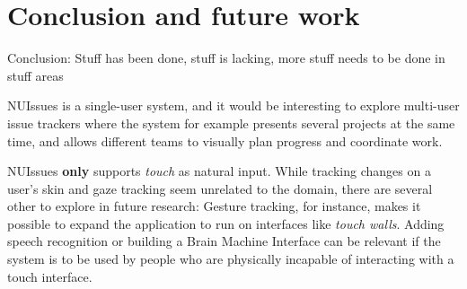 \section{Conclusion and future work}

Conclusion: Stuff has been done, stuff is lacking, more stuff needs to be done in stuff areas

NUIssues is a single-user system, and it would be interesting to explore multi-user issue trackers where the system for example presents several projects at the same time, and allows different teams to visually plan progress and coordinate work.

NUIssues \textbf{only} supports \textit{touch} as natural input. While tracking changes on a user's skin and gaze tracking seem unrelated to the domain, there are several other to explore in future research: Gesture tracking, for instance, makes it possible to expand the application to run on interfaces like \textit{touch walls}. Adding speech recognition or building a Brain Machine Interface can be relevant if the system is to be used by people who are physically incapable of interacting with a touch interface.
